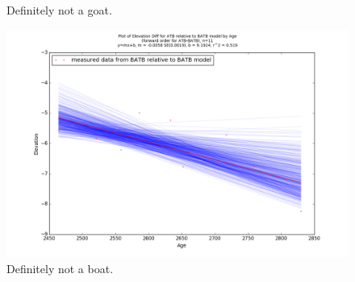 

\newpage
\begin{figure}[t]
	\caption{Definitely not a goat.}
	\label{fig:data_ATBxBATB}
\end{figure}
\newpage

\begin{figure}[t]
	\includegraphics[width=\linewidth]{data/gias/theGIA_ATB_relative_to_BATB.png}
	\caption{Definitely not a boat.}
	\label{fig:gias_ATBxBATB}
\end{figure}
\newpage


